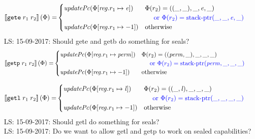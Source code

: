 \documentclass[a4paper]{article}
\newcommand\lau[1]{{\color{purple} \sf \footnotesize {LS: #1}}\\}
\newcommand{\sem}[1]{\left\llbracket #1 \right\rrbracket}
\newcommand{\tor}{\text{ or }}
\newcommand{\totherwise}{\text{otherwise }}
\newcommand{\sourcecolor}[1]{\color{blue}}
\newcommand{\src}[1]{{\sourcecolor{} #1}}
\newcommand{\targetcolor}[1]{\color{black}}
\newcommand{\trg}[1]{{\targetcolor{} #1}}
\newcommand{\zinstr}[1]{\texttt{#1}}
\newcommand{\twoinstr}[3]{
  \ifthenelse{\equal{#2#3}{}}
  {\zinstr{#1}}
  {\zinstr{#1} \; #2 \; #3}
}
\newcommand{\tgete}[2]{\twoinstr{\trg{gete}}{#1}{#2}}
\newcommand{\tgetp}[2]{\twoinstr{\trg{getp}}{#1}{#2}}
\newcommand{\tgetlin}[2]{\twoinstr{\trg{getl}}{#1}{#2}}
\newcommand{\update}[2]{[#1 \mapsto #2]}
\newcommand{\updReg}[2]{\update{\reg.#1}{#2}}
\newcommand{\perm}{\var{perm}}
\newcommand{\lin}{\var{l}}
\newcommand{\stkptr}[1]{\mathrm{stack\text{-}ptr}(#1)}
\newcommand{\var}[1]{\mathit{#1}}
\newcommand{\reg}{\var{reg}}
\newcommand{\eaddr}{\var{e}}
\newcommand{\plainfun}[2]{
  \ifthenelse{\equal{#2}{}}
  {\mathit{#1}}
  {\mathit{#1}(#2)}
}
\newcommand{\updPcAddr}[1]{\plainfun{updatePc}{#1}}
\begin{document}
\begin{align*}
  \sem{\tgete{r_1}{r_2}}(\Phi) = & 
                                   \begin{cases}
                                     \updPcAddr{\Phi\updReg{r_1}{\eaddr}} & 
                                     \arraycolsep=0pt
                                     \begin{array}[t]{l}
                                       \Phi(r_2) = ((\_,\_),\_,\eaddr,\_) \\
                                       \quad \src{\tor \Phi(r_2) = \stkptr{\_,\_,\eaddr,\_} } \\
                                     \end{array} \\
                                     \updPcAddr{\Phi\updReg{r_1}{-1}} & \totherwise
                                   \end{cases}
\end{align*}
\lau{15-09-2017: Should gete and getb do something for seals?}

\begin{align*}
  \sem{\tgetp{r_1}{r_2}}(\Phi) = & 
                                   \begin{cases}
                                     \updPcAddr{\Phi\updReg{r_1}{\perm}} & 
                                     \arraycolsep=0pt
                                     \begin{array}[t]{l}
                                       \Phi(r_2) = ((\perm,\_),\_,\_,\_) \\
                                       \quad \src{\tor \Phi(r_2) = \stkptr{\perm,\_,\_,\_} } \\
                                     \end{array} \\
                                     \updPcAddr{\Phi\updReg{r_1}{-1}} & \totherwise
                                   \end{cases}
\end{align*}

\begin{align*}
  \sem{\tgetlin{r_1}{r_2}}(\Phi) = & 
                                   \begin{cases}
                                     \updPcAddr{\Phi\updReg{r_1}{\lin}} & 
                                     \arraycolsep=0pt
                                     \begin{array}[t]{l}
                                       \Phi(r_2) = ((\_,\lin),\_,\_,\_) \\
                                       \quad \src{\tor \Phi(r_2) = \stkptr{\_,\_,\_,\_} } \\
                                     \end{array} \\
                                     \updPcAddr{\Phi\updReg{r_1}{-1}} & \totherwise
                                   \end{cases}
\end{align*}
\lau{15-09-2017: Should getl do something for seals?}
\lau{15-09-2017: Do we want to allow getl and getp to work on sealed capabilities?}
\end{document}
